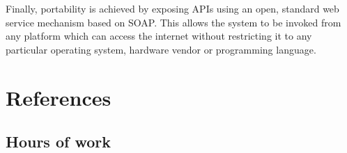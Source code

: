 Finally, portability is achieved by exposing APIs using an open, standard web service mechanism based on SOAP. This allows the system to be invoked from any platform which can access the internet without restricting it to any particular operating system, hardware vendor or programming language. 

\chapter{References}

\begin{appendices}

\chapter{Hours of work}

\end{appendices}